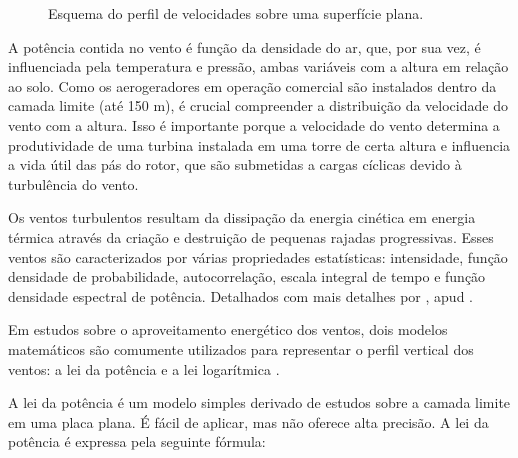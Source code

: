         \begin{figure}[H]
            \caption{Esquema do perfil de velocidades sobre uma superfície plana. }
            \label{fig:Esquema do perfil de velocidades}
            \centering
        \end{figure}

        \par A potência contida no vento é função da densidade do ar, que, por sua vez, é influenciada pela temperatura e pressão, ambas variáveis com a altura em relação ao solo. Como os aerogeradores em operação comercial são instalados dentro da camada limite (até 150 m), é crucial compreender a distribuição da velocidade do vento com a altura. Isso é importante porque a velocidade do vento determina a produtividade de uma turbina instalada em uma torre de certa altura e influencia a vida útil das pás do rotor, que são submetidas a cargas cíclicas devido à turbulência do vento.

        \par Os ventos turbulentos resultam da dissipação da energia cinética em energia térmica através da criação e destruição de pequenas rajadas progressivas. Esses ventos são caracterizados por várias propriedades estatísticas: intensidade, função densidade de probabilidade, autocorrelação, escala integral de tempo e função densidade espectral de potência. Detalhados com mais detalhes por , apud .

        \par Em estudos sobre o aproveitamento energético dos ventos, dois modelos matemáticos são comumente utilizados para representar o perfil vertical dos ventos: a lei da potência e a lei logarítmica \cite{fadigas2011}.

        \par A lei da potência é um modelo simples derivado de estudos sobre a camada limite em uma placa plana. É fácil de aplicar, mas não oferece alta precisão. A lei da potência é expressa pela seguinte fórmula:

